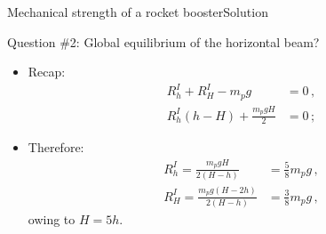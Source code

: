 \documentclass{beamer}
\newcommand{\Rj}{R}
\begin{document}
\begin{frame}{Mechanical strength of a rocket booster}{Solution}
\begin{overprint}
\vskip-20pt
\begin{exampleblock}{Question \#2: Global equilibrium of the horizontal beam?}
\begin{itemize}
\item Recap:
\begin{displaymath}
\begin{split}
\Rj_h^I+\Rj_H^I-m_p g &=0\,, \\
\Rj_h^I(h-H)+\frac{m_p gH}{2} &=0\,;
\end{split}
\end{displaymath}
\item Therefore:
\begin{displaymath}
\begin{split}
\Rj_h^I =\frac{m_p gH}{2(H-h)} &=\frac{5}{8}m_p g\,, \\
\Rj_H^I =\frac{m_p g(H-2h)}{2(H-h)} &=\frac{3}{8}m_p g\,,
\end{split}
\end{displaymath}
owing to $H=5h$.
\end{itemize}
\end{exampleblock}

\end{overprint}

\end{frame}
\end{document}
